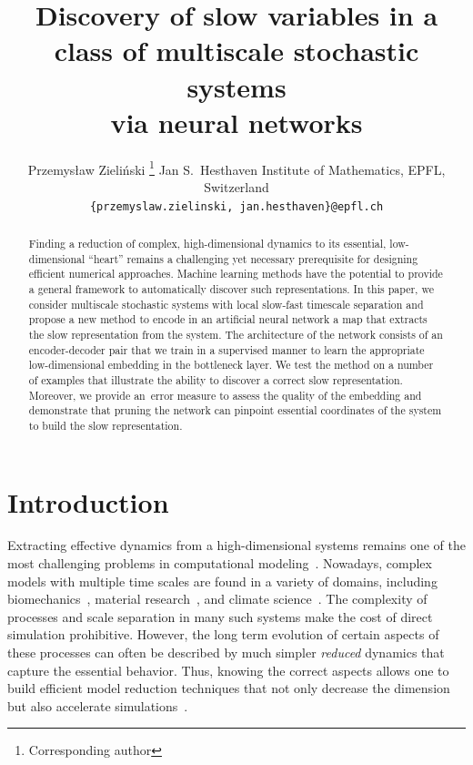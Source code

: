 \documentclass{article}
\title{Discovery of slow variables in a class of multiscale stochastic systems\\ via neural networks}
\author{
    \href{https://orcid.org/0000-0003-3317-8908}{\orcid}
    Przemys{\l}aw Zieli\'{n}ski
    \thanks{Corresponding author}
	\And
	\href{https://orcid.org/0000-0001-8074-1586}{\orcid}
	Jan S.~Hesthaven
	\And
	\textnormal{Institute of Mathematics, EPFL, Switzerland}\\[.5em]
	\texttt{\{przemyslaw.zielinski, jan.hesthaven\}@epfl.ch}
}
\begin{document}
\maketitle

\begin{abstract}
    Finding a reduction of complex, high-dimensional dynamics to its essential, low-dimensional ``heart'' remains a challenging yet necessary prerequisite for designing efficient numerical approaches. Machine learning methods have the potential to provide a general framework to automatically discover such representations. In this paper, we consider multiscale stochastic systems with local slow-fast timescale separation and propose a new method to encode in an artificial neural network a map that extracts the slow representation from the system. The architecture of the network consists of an encoder-decoder pair that we train in a supervised manner to learn the appropriate low-dimensional embedding in the bottleneck layer. We test the method on a number of examples that illustrate the ability to discover a correct slow representation. Moreover, we provide an~error measure to assess the quality of the embedding and demonstrate that pruning the network can pinpoint essential coordinates of the system to build the slow representation.
\end{abstract}




\section{Introduction}
\label{sec:intro}
Extracting effective dynamics from a high-dimensional systems remains one of the most challenging problems in computational modeling~\cite{froyland_computational_2014}. Nowadays, complex models with multiple time scales are found in a variety of domains, including biomechanics~\cite{bhattacharya_multiscale_2017, favino_multiscale_2018}, material research~\cite{praprotnik_multiscale_2008, van_der_giessen_roadmap_2020}, and climate science~\cite{majda_mathematical_2001, palmer_stochastic_2019}. The complexity of processes and scale separation in many such systems make the cost of direct simulation prohibitive. However, the long term evolution of certain aspects of these processes can often be described by much simpler \emph{reduced} dynamics that capture the essential behavior. Thus, knowing the correct aspects allows one to build efficient model reduction techniques that not only decrease the dimension but also accelerate simulations~\cite{debrabant_micro-macro_2017,katsoulakis_datadriven_2020,kevrekidis_equation-free_2009,legoll_effective_2010}.
\end{document}

